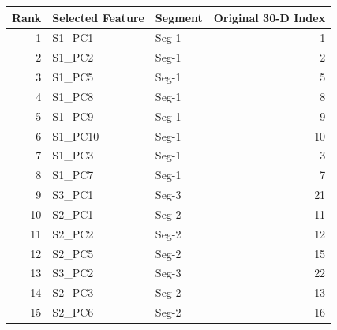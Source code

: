 \begin{tabular}{rllr}
\toprule
Rank & Selected Feature & Segment & Original 30-D Index \\
\midrule
1 & S1_PC1 & Seg-1 & 1 \\
2 & S1_PC2 & Seg-1 & 2 \\
3 & S1_PC5 & Seg-1 & 5 \\
4 & S1_PC8 & Seg-1 & 8 \\
5 & S1_PC9 & Seg-1 & 9 \\
6 & S1_PC10 & Seg-1 & 10 \\
7 & S1_PC3 & Seg-1 & 3 \\
8 & S1_PC7 & Seg-1 & 7 \\
9 & S3_PC1 & Seg-3 & 21 \\
10 & S2_PC1 & Seg-2 & 11 \\
11 & S2_PC2 & Seg-2 & 12 \\
12 & S2_PC5 & Seg-2 & 15 \\
13 & S3_PC2 & Seg-3 & 22 \\
14 & S2_PC3 & Seg-2 & 13 \\
15 & S2_PC6 & Seg-2 & 16 \\
\bottomrule
\end{tabular}

